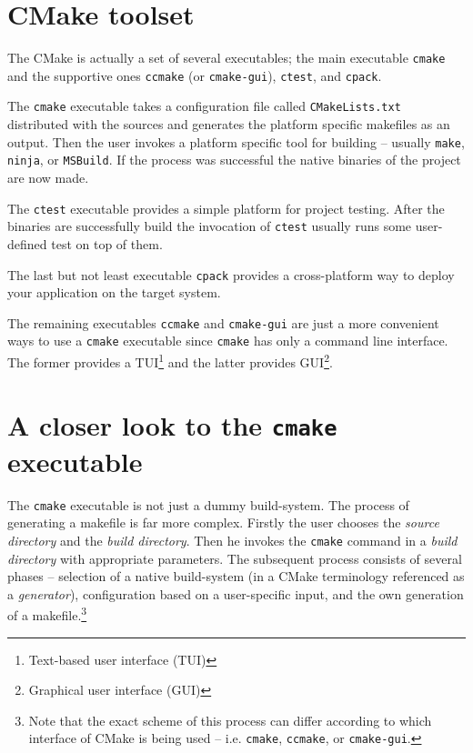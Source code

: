\documentclass[12pt,oneside]{fithesis2}
\begin{document}
\section{CMake toolset}

The CMake is actually a set of several executables; the main executable \texttt{cmake} and the supportive ones \texttt{ccmake} (or \texttt{cmake-gui}), \texttt{ctest}, and \texttt{cpack}.

The \texttt{cmake} executable takes a configuration file called \texttt{CMakeLists.txt} distributed with the sources and generates the platform specific makefiles as an output. Then the user invokes a platform specific tool for building -- usually \texttt{make}, \texttt{ninja}, or \texttt{MSBuild}. If the process was successful the native binaries of the project are now made.

The \texttt{ctest} executable provides a simple platform for project testing. After the binaries are successfully build the invocation of \texttt{ctest} usually runs some user-defined test on top of them.

The last but not least executable \texttt{cpack} provides a cross-platform way to deploy your application on the target system.

The remaining executables \texttt{ccmake} and \texttt{cmake-gui} are just a more convenient ways to use a \texttt{cmake} executable since \texttt{cmake} has only a command line interface. The former provides a TUI\footnote{Text-based user interface (TUI)} and the latter provides GUI\footnote{Graphical user interface (GUI)}.

\section{A closer look to the \texttt{cmake} executable}

The \texttt{cmake} executable is not just a dummy build-system. The process of generating a makefile is far more complex. Firstly the user chooses the \emph{source directory} and the \emph{build directory}. Then he invokes the \texttt{cmake} command in a \emph{build directory} with appropriate parameters. The subsequent process consists of several phases -- selection of a native build-system (in a CMake terminology referenced as a \emph{generator}), configuration based on a user-specific input, and the own generation of a makefile.\footnote{Note that the exact scheme of this process can differ according to which interface of CMake is being used -- i.e. \texttt{cmake}, \texttt{ccmake}, or \texttt{cmake-gui}.}
\end{document}
